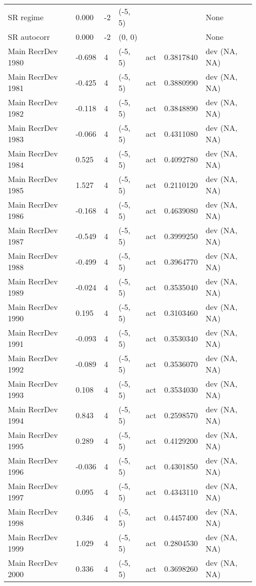 \documentclass[11pt,
  english,
  a4paper,
]{article}
\begin{document}
\begin{landscape}
\begin{longtable}[t]{>{\raggedright\arraybackslash}p{8.5cm}lllll>{\raggedright\arraybackslash}p{4cm}}
SR regime & 0.000 & -2 & (-5, 5) &  &  & None\\
SR autocorr & 0.000 & -2 & (0, 0) &  &  & None\\
Main RecrDev 1980 & -0.698 & 4 & (-5, 5) & act & 0.3817840 & dev (NA, NA)\\
Main RecrDev 1981 & -0.425 & 4 & (-5, 5) & act & 0.3880990 & dev (NA, NA)\\
Main RecrDev 1982 & -0.118 & 4 & (-5, 5) & act & 0.3848890 & dev (NA, NA)\\
Main RecrDev 1983 & -0.066 & 4 & (-5, 5) & act & 0.4311080 & dev (NA, NA)\\
Main RecrDev 1984 & 0.525 & 4 & (-5, 5) & act & 0.4092780 & dev (NA, NA)\\
Main RecrDev 1985 & 1.527 & 4 & (-5, 5) & act & 0.2110120 & dev (NA, NA)\\
Main RecrDev 1986 & -0.168 & 4 & (-5, 5) & act & 0.4639080 & dev (NA, NA)\\
Main RecrDev 1987 & -0.549 & 4 & (-5, 5) & act & 0.3999250 & dev (NA, NA)\\
Main RecrDev 1988 & -0.499 & 4 & (-5, 5) & act & 0.3964770 & dev (NA, NA)\\
Main RecrDev 1989 & -0.024 & 4 & (-5, 5) & act & 0.3535040 & dev (NA, NA)\\
Main RecrDev 1990 & 0.195 & 4 & (-5, 5) & act & 0.3103460 & dev (NA, NA)\\
Main RecrDev 1991 & -0.093 & 4 & (-5, 5) & act & 0.3530340 & dev (NA, NA)\\
Main RecrDev 1992 & -0.089 & 4 & (-5, 5) & act & 0.3536070 & dev (NA, NA)\\
Main RecrDev 1993 & 0.108 & 4 & (-5, 5) & act & 0.3534030 & dev (NA, NA)\\
Main RecrDev 1994 & 0.843 & 4 & (-5, 5) & act & 0.2598570 & dev (NA, NA)\\
Main RecrDev 1995 & 0.289 & 4 & (-5, 5) & act & 0.4129200 & dev (NA, NA)\\
Main RecrDev 1996 & -0.036 & 4 & (-5, 5) & act & 0.4301850 & dev (NA, NA)\\
Main RecrDev 1997 & 0.095 & 4 & (-5, 5) & act & 0.4343110 & dev (NA, NA)\\
Main RecrDev 1998 & 0.346 & 4 & (-5, 5) & act & 0.4457400 & dev (NA, NA)\\
Main RecrDev 1999 & 1.029 & 4 & (-5, 5) & act & 0.2804530 & dev (NA, NA)\\
Main RecrDev 2000 & 0.336 & 4 & (-5, 5) & act & 0.3698260 & dev (NA, NA)\\

\end{longtable}
\end{landscape}
\end{document}
